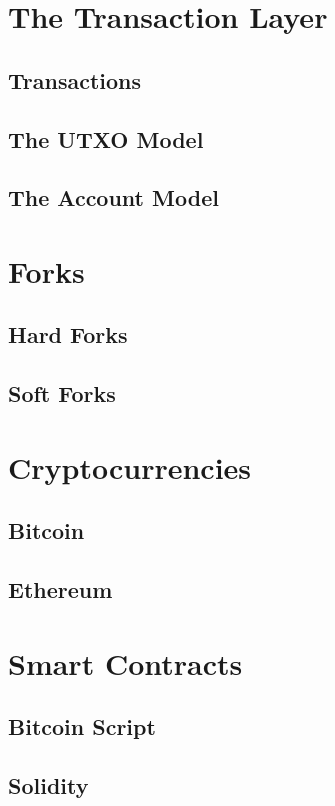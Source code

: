\section{The Transaction Layer}
\subsection{Transactions}
\subsection{The UTXO Model}
\subsection{The Account Model}

\section{Forks}
\subsection{Hard Forks}
\subsection{Soft Forks}

\section{Cryptocurrencies}
\subsection{Bitcoin}
\subsection{Ethereum}

\section{Smart Contracts}
\subsection{Bitcoin Script}
\subsection{Solidity}


